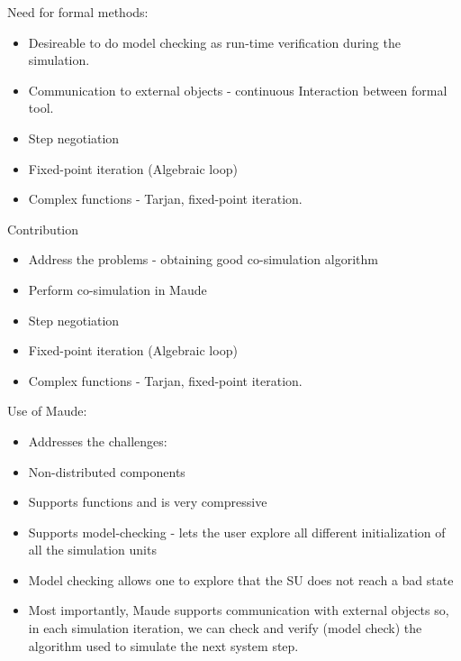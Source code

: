 \documentclass[runningheads]{llncs}
\begin{document}
Need for formal methods:
\begin{itemize}
  \item Desireable to do model checking as run-time verification during the simulation.
  \item Communication to external objects - continuous Interaction between formal tool.
  \item Step negotiation
  \item Fixed-point iteration (Algebraic loop)
  \item Complex functions - Tarjan, fixed-point iteration.
\end{itemize}

Contribution
\begin{itemize}
  \item Address the problems - obtaining good co-simulation algorithm
  \item Perform co-simulation in Maude
  \item Step negotiation
  \item Fixed-point iteration (Algebraic loop)
  \item Complex functions - Tarjan, fixed-point iteration.
\end{itemize}

Use of Maude:
\begin{itemize}
  \item Addresses the challenges:
  \item Non-distributed components
  \item Supports functions and is very compressive
  \item Supports model-checking - lets the user explore all different initialization of all the simulation units
  \item Model checking allows one to explore that the SU does not reach a bad state
  \item Most importantly, Maude supports communication with external objects so, in each simulation iteration, we can check and verify (model check) the algorithm used to simulate the next system step.
\end{itemize}
\end{document}
